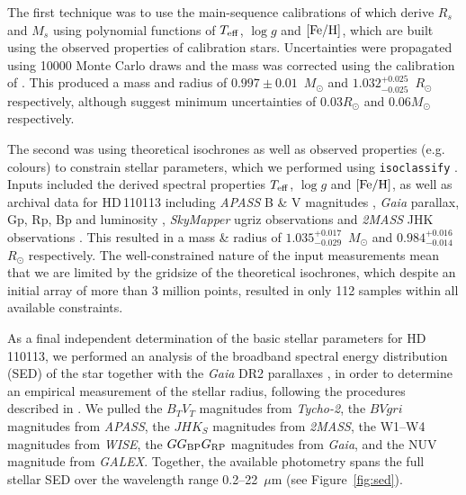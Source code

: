 \documentclass[fleqn,usenatbib]{mnras}
\newcommand{\msun}{\mbox{$M_{\odot}$}}
\newcommand{\rsun}{\mbox{$R_{\odot}$}}
\newcommand{\teff}{$T_{\rm eff}$}
\newcommand{\feh}{\mbox{$\rm [Fe/H]$}}
\newcommand{\logg}{$\log g$}
\newcommand{\Tmstartorres}{ $ 0.997 \pm 0.01 $ }
\newcommand{\Trstartorres}{ $ 1.032^{+0.025}_{-0.025} $ }
\newcommand{\Tradiso}{ $ 0.984^{+0.016}_{-0.014} $ }
\newcommand{\Tmassiso}{ $ 1.035^{+0.017}_{-0.029} $ }
\newcommand{\Tstar}{HD\,110113}
\begin{document}
The first technique was to use the main-sequence calibrations of \citet{2010A&ARv..18...67T} which derive $R_s$ and $M_s$ using polynomial functions of \teff{}, \logg{} and \feh{}, which are built using the observed properties of calibration stars. 
Uncertainties were propagated using 10000 Monte Carlo draws and the mass was corrected using the calibration of \citet{Santos-13}. 
This produced a mass and radius of \Tmstartorres{}\,\msun{} and \Trstartorres{}\,\rsun{} respectively, although \citet{2010A&ARv..18...67T} suggest minimum uncertainties of 0.03\rsun{} and 0.06\msun{} respectively.

The second was using theoretical isochrones \citep[MIST,][]{2016ApJ...823..102C} as well as observed properties (e.g. colours) to constrain stellar parameters, which we performed using \texttt{isoclassify} \citep{2017zndo....573372H,2020AJ....159..280B}.
Inputs included the derived spectral properties \teff{}, \logg{} and \feh{}, as well as archival data for \Tstar{} including {\it APASS} B \& V magnitudes \citep{apass}, {\it Gaia} parallax, Gp, Rp, Bp and luminosity \citep{brown2018gaia}, \textit{SkyMapper} ugriz observations \citep{2020arXiv200810359O} and {\it 2MASS} JHK observations \citep{skrutskie2006two}.
This resulted in a mass \& radius of \Tmassiso{}\,\msun{} and \Tradiso{}\,\rsun{} respectively.
The well-constrained nature of the input measurements mean that we are limited by the gridsize of the theoretical isochrones, which despite an initial array of more than 3 million points, resulted in only 112 samples within all available constraints.

As a final independent determination of the basic stellar parameters for \Tstar, we performed an analysis of the broadband spectral energy distribution (SED) of the star together with the {\it Gaia\/} DR2 parallaxes \citep[adjusted by $+0.08$~mas to account for the systematic offset reported by][]{StassunTorres:2018}, in order to determine an empirical measurement of the stellar radius, following the procedures described in \citet{Stassun:2016,Stassun:2017,Stassun:2018}. We pulled the $B_T V_T$ magnitudes from {\it Tycho-2}, the $BVgri$ magnitudes from {\it APASS}, the $JHK_S$ magnitudes from {\it 2MASS}, the W1--W4 magnitudes from {\it WISE}, the $G G_{\rm BP} G_{\rm RP}$ magnitudes from {\it Gaia}, and the NUV magnitude from {\it GALEX}. Together, the available photometry spans the full stellar SED over the wavelength range 0.2--22~$\mu$m (see Figure~\ref{fig:sed}).  
\end{document}
